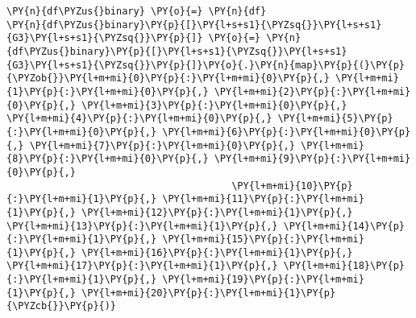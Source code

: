     \begin{tcolorbox}[breakable, size=fbox, boxrule=1pt, pad at break*=1mm,colback=cellbackground, colframe=cellborder]
\begin{Verbatim}[commandchars=\\\{\}]
\PY{n}{df\PYZus{}binary} \PY{o}{=} \PY{n}{df}
\PY{n}{df\PYZus{}binary}\PY{p}{[}\PY{l+s+s1}{\PYZsq{}}\PY{l+s+s1}{G3}\PY{l+s+s1}{\PYZsq{}}\PY{p}{]} \PY{o}{=} \PY{n}{df\PYZus{}binary}\PY{p}{[}\PY{l+s+s1}{\PYZsq{}}\PY{l+s+s1}{G3}\PY{l+s+s1}{\PYZsq{}}\PY{p}{]}\PY{o}{.}\PY{n}{map}\PY{p}{(}\PY{p}{\PYZob{}}\PY{l+m+mi}{0}\PY{p}{:}\PY{l+m+mi}{0}\PY{p}{,} \PY{l+m+mi}{1}\PY{p}{:}\PY{l+m+mi}{0}\PY{p}{,} \PY{l+m+mi}{2}\PY{p}{:}\PY{l+m+mi}{0}\PY{p}{,} \PY{l+m+mi}{3}\PY{p}{:}\PY{l+m+mi}{0}\PY{p}{,} \PY{l+m+mi}{4}\PY{p}{:}\PY{l+m+mi}{0}\PY{p}{,} \PY{l+m+mi}{5}\PY{p}{:}\PY{l+m+mi}{0}\PY{p}{,} \PY{l+m+mi}{6}\PY{p}{:}\PY{l+m+mi}{0}\PY{p}{,} \PY{l+m+mi}{7}\PY{p}{:}\PY{l+m+mi}{0}\PY{p}{,} \PY{l+m+mi}{8}\PY{p}{:}\PY{l+m+mi}{0}\PY{p}{,} \PY{l+m+mi}{9}\PY{p}{:}\PY{l+m+mi}{0}\PY{p}{,}
                                       \PY{l+m+mi}{10}\PY{p}{:}\PY{l+m+mi}{1}\PY{p}{,} \PY{l+m+mi}{11}\PY{p}{:}\PY{l+m+mi}{1}\PY{p}{,} \PY{l+m+mi}{12}\PY{p}{:}\PY{l+m+mi}{1}\PY{p}{,} \PY{l+m+mi}{13}\PY{p}{:}\PY{l+m+mi}{1}\PY{p}{,} \PY{l+m+mi}{14}\PY{p}{:}\PY{l+m+mi}{1}\PY{p}{,} \PY{l+m+mi}{15}\PY{p}{:}\PY{l+m+mi}{1}\PY{p}{,} \PY{l+m+mi}{16}\PY{p}{:}\PY{l+m+mi}{1}\PY{p}{,} \PY{l+m+mi}{17}\PY{p}{:}\PY{l+m+mi}{1}\PY{p}{,} \PY{l+m+mi}{18}\PY{p}{:}\PY{l+m+mi}{1}\PY{p}{,} \PY{l+m+mi}{19}\PY{p}{:}\PY{l+m+mi}{1}\PY{p}{,} \PY{l+m+mi}{20}\PY{p}{:}\PY{l+m+mi}{1}\PY{p}{\PYZcb{}}\PY{p}{)}
\end{Verbatim}
\end{tcolorbox}


